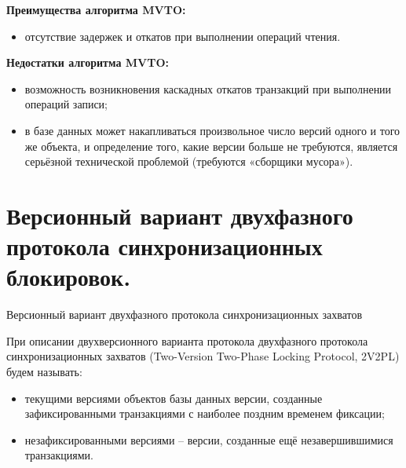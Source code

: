 \documentclass[a4paper,12pt]{article}
\begin{document}
\begin{center}
\end{center}

\textbf{Преимущества алгоритма MVTO:}
\begin{itemize}
    \item отсутствие задержек и откатов при выполнении операций чтения.
\end{itemize}

\textbf{Недостатки алгоритма MVTO:}
\begin{itemize}
    \item возможность возникновения каскадных откатов транзакций при выполнении операций записи;
    \item в базе данных может накапливаться произвольное число версий одного и того же объекта, и определение того, какие версии больше не требуются, является серьёзной технической проблемой (требуются «сборщики мусора»).
\end{itemize}


\section{Версионный вариант двухфазного протокола синхронизационных блокировок.}

Версионный вариант двухфазного протокола синхронизационных захватов

При описании двухверсионного варианта протокола двухфазного протокола синхронизационных захватов (Two-Version Two-Phase Locking Protocol, 2V2PL) будем называть:
\begin{itemize}
    \item текущими версиями объектов базы данных версии, созданные зафиксированными транзакциями с наиболее поздним временем фиксации;
    \item незафиксированными версиями – версии, созданные ещё незавершившимися транзакциями.
\end{itemize}
\end{document}
